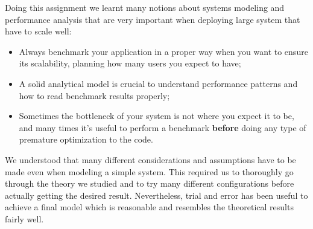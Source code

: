 \documentclass[11pt]{scrartcl} %
\begin{document}
Doing this assignment we learnt many notions about systems modeling and performance analysis that are very important when deploying large system that have to scale well:

\begin{itemize}
\item[\adforn{43}] Always benchmark your application in a proper way when you want to ensure its scalability, planning how many users you expect to have;
\item[\adforn{43}] A solid analytical model is crucial to understand performance patterns and how to read benchmark results properly;
\item[\adforn{43}] Sometimes the bottleneck of your system is not where you expect it to be, and many times it's useful to perform a benchmark \textbf{before} doing any type of premature optimization to the code.
\end{itemize}

We understood that many different considerations and assumptions have to be made even when modeling a simple system. This required us to thoroughly go through the theory we studied and to try many different configurations before actually getting the desired result. Nevertheless, trial and error has been useful to achieve a final model which is reasonable and resembles the theoretical results fairly well.
\end{document}
